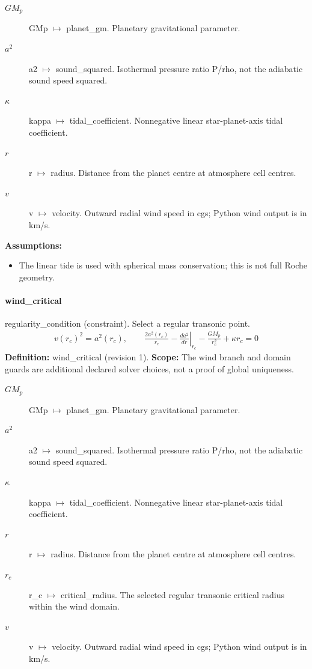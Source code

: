 \begin{description}
\item[$GM_p$] GMp $\mapsto$ planet\_gm. Planetary gravitational parameter.
\item[$a^2$] a2 $\mapsto$ sound\_squared. Isothermal pressure ratio P/rho, not the adiabatic sound speed squared.
\item[$\kappa$] kappa $\mapsto$ tidal\_coefficient. Nonnegative linear star-planet-axis tidal coefficient.
\item[$r$] r $\mapsto$ radius. Distance from the planet centre at atmosphere cell centres.
\item[$v$] v $\mapsto$ velocity. Outward radial wind speed in cgs; Python wind output is in km/s.
\end{description}

\noindent\textbf{Assumptions:}
\begin{itemize}
\item The linear tide is used with spherical mass conservation; this is not full Roche geometry.
\end{itemize}

\paragraph{wind\_critical}
regularity\_condition (constraint). Select a regular transonic point.
\begin{equation}
\begin{aligned}
v(r_c)^2=a^2(r_c),\qquad \frac{2a^2(r_c)}{r_c}-\left.\frac{da^2}{dr}\right|_{r_c}-\frac{GM_p}{r_c^2}+\kappa r_c=0
\end{aligned}
\label{eq:escape.mathematical_5f_model_3a_composition_5f_wind:wind_5f_critical:2}
\end{equation}
\noindent\textbf{Definition:} wind\_critical (revision 1).
\textbf{Scope:} The wind branch and domain guards are additional declared solver choices, not a proof of global uniqueness.

\begin{description}
\item[$GM_p$] GMp $\mapsto$ planet\_gm. Planetary gravitational parameter.
\item[$a^2$] a2 $\mapsto$ sound\_squared. Isothermal pressure ratio P/rho, not the adiabatic sound speed squared.
\item[$\kappa$] kappa $\mapsto$ tidal\_coefficient. Nonnegative linear star-planet-axis tidal coefficient.
\item[$r$] r $\mapsto$ radius. Distance from the planet centre at atmosphere cell centres.
\item[$r_c$] r\_c $\mapsto$ critical\_radius. The selected regular transonic critical radius within the wind domain.
\item[$v$] v $\mapsto$ velocity. Outward radial wind speed in cgs; Python wind output is in km/s.
\end{description}


